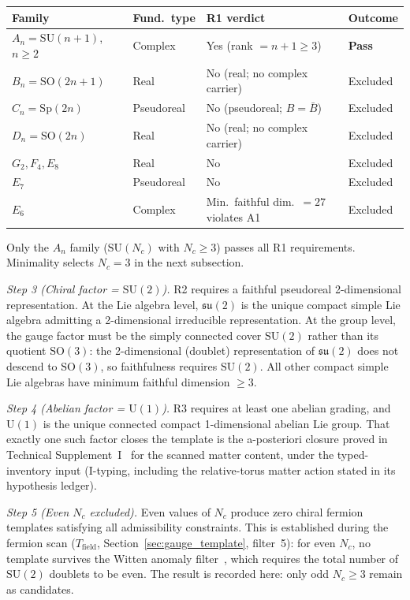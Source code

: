 \documentclass[11pt]{article}
\newcommand{\SU}{\mathrm{SU}}
\newcommand{\U}{\mathrm{U}}
\begin{document}
\begin{tcolorbox}[apfbox, title={Lemma $L_{\mathrm{gauge,unique}}$ (Gauge Template Uniqueness)}]
\smallskip
\begin{center}
\small
\begin{tabular}{llp{4.2cm}l}
\toprule
\textbf{Family} & \textbf{Fund.\ type} & \textbf{R1 verdict} & \textbf{Outcome} \\
\midrule
$A_n = \SU(n\!+\!1)$, $n \ge 2$ & Complex & Yes (rank $= n+1 \ge 3$) & \textbf{Pass} \\
$B_n = \mathrm{SO}(2n\!+\!1)$ & Real & No (real; no complex carrier) & Excluded \\
$C_n = \mathrm{Sp}(2n)$ & Pseudoreal & No (pseudoreal; $B = \bar{B}$) & Excluded \\
$D_n = \mathrm{SO}(2n)$ & Real & No (real; no complex carrier) & Excluded \\
$G_2, F_4, E_8$ & Real & No & Excluded \\
$E_7$ & Pseudoreal & No & Excluded \\
$E_6$ & Complex & Min.\ faithful dim.\ $= 27$ violates A1 & Excluded \\
\bottomrule
\end{tabular}
\end{center}
\smallskip

Only the $A_n$ family ($\SU(N_c)$ with $N_c \ge 3$) passes all R1 requirements.  Minimality selects $N_c = 3$ in the next subsection.

\medskip\noindent\textit{Step 3 (Chiral factor = $\SU(2)$).}  R2 requires a faithful pseudoreal 2-dimensional representation.  At the Lie algebra level, $\mathfrak{su}(2)$ is the unique compact simple Lie algebra admitting a 2-dimensional irreducible representation.  At the group level, the gauge factor must be the simply connected cover $\SU(2)$ rather than its quotient $\mathrm{SO}(3)$: the 2-dimensional (doublet) representation of $\mathfrak{su}(2)$ does not descend to $\mathrm{SO}(3)$, so faithfulness requires $\SU(2)$.  All other compact simple Lie algebras have minimum faithful dimension $\ge 3$.

\medskip\noindent\textit{Step 4 (Abelian factor = $\U(1)$).}  R3 requires at least one abelian grading, and $\U(1)$ is the unique connected compact 1-dimensional abelian Lie group.  That exactly one such factor closes the template is the a-posteriori closure proved in Technical Supplement~I~\cite{BrookeP2Supplement} for the scanned matter content, under the typed-inventory input (I-typing, including the relative-torus matter action stated in its hypothesis ledger).

\medskip\noindent\textit{Step 5 (Even $N_c$ excluded).}  Even values of $N_c$ produce zero chiral fermion templates satisfying all admissibility constraints.  This is established during the fermion scan ($T_{\mathrm{field}}$, Section~\ref{sec:gauge_template}, filter~5): for even $N_c$, no template survives the Witten anomaly filter~\cite{Witten1982}, which requires the total number of $\SU(2)$ doublets to be even.  The result is recorded here: only odd $N_c \ge 3$ remain as candidates.


\end{tcolorbox}
\end{document}
